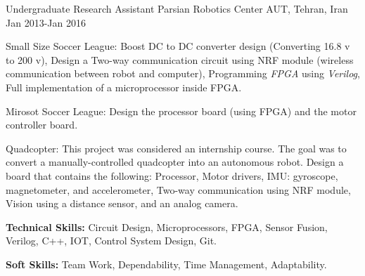 \begin{cventries}
  \cventry
 {Undergraduate Research Assistant}  %
    {Parsian Robotics Center} %
    {AUT, Tehran, Iran} %
    {Jan 2013-Jan 2016} %
    {
          \begin{cvitems} %
            \item {Small Size Soccer League:	Boost DC to DC converter design (Converting 16.8 v to 200 v),	Design a Two-way communication circuit using NRF module (wireless communication between robot and computer), Programming \textit{FPGA} using \textit{Verilog}, Full implementation of a microprocessor inside FPGA.}
            \item {Mirosot Soccer League:	Design the processor board (using FPGA) and the motor controller board.}
            \item{Quadcopter: This project was considered an internship course. The goal was to convert a manually-controlled quadcopter into an autonomous robot. Design a board that contains the following: Processor, Motor drivers, IMU: gyroscope, magnetometer, and accelerometer, Two-way communication using NRF module, Vision using a distance sensor, and an analog camera.}
            \item {\textbf{Technical Skills:} Circuit Design, Microprocessors, FPGA, Sensor Fusion, Verilog, C++, IOT, Control System Design, Git.}
        \item {\textbf{Soft Skills:} Team Work, Dependability, Time Management, Adaptability.}
          \end{cvitems}
    }
\end{cventries}


